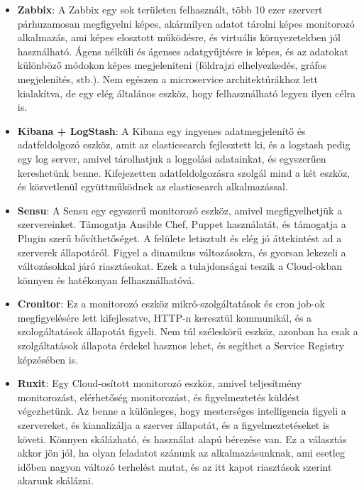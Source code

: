 \documentclass[11pt,magyar,a4paper,oneside,]{report}
\begin{document}
\begin{itemize}
\item
  \textbf{Zabbix}: A Zabbix egy sok területen felhasznált, több 10 ezer
  szervert párhuzamosan megfigyelni képes, akármilyen adatot tárolni
  képes monitorozó alkalmazás, ami képes elosztott működésre, és
  virtuális környezetekben jól használható. Ágens nélküli és ágenses
  adatgyűjtésre is képes, és az adatokat különböző módokon képes
  megjeleníteni (földrajzi elhelyezkedés, gráfos megjelenítés, stb.).
  Nem egészen a microservice architektúrákhoz lett kialakítva, de egy
  elég általános eszköz, hogy felhasználható legyen ilyen célra is.
\item
  \textbf{Kibana + LogStash}: A Kibana egy ingyenes adatmegjelenítő és
  adatfeldolgozó eszköz, amit az elasticsearch fejlesztett ki, és a
  logstash pedig egy log server, amivel tárolhatjuk a loggolási
  adatainkat, és egyszerűen kereshetünk benne. Kifejezetten
  adatfeldolgozásra szolgál mind a két eszköz, és közvetlenül
  együttműködnek az elasticsearch alkalmazással.
\item
  \textbf{Sensu}: A Sensu egy egyszerű monitorozó eszköz, amivel
  megfigyelhetjük a szervereinket. Támogatja Ansible Chef, Puppet
  használatát, és támogatja a Plugin szerű bővíthetőséget. A felülete
  letisztult és elég jó áttekintést ad a szerverek állapotáról. Figyel a
  dinamikus változásokra, és gyorsan lekezeli a változásokkal járó
  riasztásokat. Ezek a tulajdonságai teszik a Cloud-okban könnyen és
  hatékonyan felhasználhatóvá.
\item
  \textbf{Cronitor}: Ez a monitorozó eszköz mikró-szolgáltatások és cron
  job-ok megfigyelésére lett kifejlesztve, HTTP-n keresztül kommunikál,
  és a szologáltatások állapotát figyeli. Nem túl széleskörű eszköz,
  azonban ha csak a szolgáltatások állapota érdekel hasznos lehet, és
  segíthet a Service Registry képzésében is.
\item
  \textbf{Ruxit}: Egy Cloud-osított monitorozó eszköz, amivel
  teljesítmény monitorozást, elérhetőség monitorozást, és figyelmeztetés
  küldést végezhetünk. Az benne a különleges, hogy mesterséges
  intelligencia figyeli a szervereket, és kianalizálja a szerver
  állapotát, és a figyelmeztetéseket is követi. Könnyen skálázható, és
  használat alapú bérezése van. Ez a választás akkor jön jól, ha olyan
  feladatot szánunk az alkalmazásunknak, ami esetleg időben nagyon
  változó terhelést mutat, és az itt kapot riasztások szerint akarunk
  skálázni.
\end{itemize}
\end{document}
